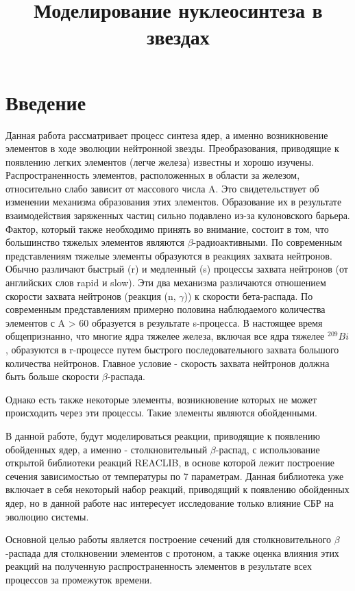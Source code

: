 \documentclass[%
master,    %
natbib,      %
subf,        %
href,        %
colorlinks,  %
]{disser}
\begin{document}
\title{Моделирование нуклеосинтеза в звездах}
\maketitle
\section*{\centering Введение}
Данная работа рассматривает процесс синтеза ядер, а именно возникновение элементов в ходе эволюции нейтронной звезды. Преобразования, приводящие к появлению легких элементов (легче железа) известны и хорошо изучены. Распространенность элементов, расположенных в области за железом, относительно слабо зависит от массового числа A. Это свидетельствует об изменении механизма образования этих элементов.  Образование их в результате взаимодействия заряженных частиц сильно подавлено из-за кулоновского барьера. Фактор, который также необходимо принять во внимание, состоит в том, что большинство тяжелых элементов являются $\beta$-радиоактивными. По современным представлениям тяжелые элементы образуются в реакциях захвата нейтронов. Обычно различают быстрый (r) и медленный (s) процессы захвата нейтронов (от английских слов rapid и slow). Эти два механизма различаются отношением скорости захвата нейтронов (реакция (n, $\gamma$)) к скорости бета-распада. По современным представлениям примерно половина наблюдаемого количества элементов с A > 60 образуется в результате s-процесса. В настоящее время общепризнанно, что многие ядра тяжелее железа, включая все ядра тяжелее $^{209}Bi$, образуются в r-процессе путем быстрого последовательного захвата большого количества нейтронов. Главное условие - скорость захвата нейтронов должна быть больше скорости $\beta$-распада. 

Однако есть также некоторые элементы, возникновение которых не может происходить через эти процессы. Такие элементы являются обойденными. 

В данной работе, будут моделироваться реакции, приводящие к появлению обойденных ядер, а именно - столкновительный $\beta$-распад, с использование открытой библиотеки реакций REACLIB, в основе которой лежит построение сечения зависимостью от температуры по 7 параметрам. Данная библиотека уже включает в себя некоторый набор реакций, приводящий к появлению обойденных ядер, но в данной работе нас интересует исследование только влияние СБР на эволюцию системы. 

Основной целью работы является построение сечений для столкновительного $\beta$-распада для столкновении элементов с протоном, а также оценка влияния этих реакций на полученную распространенность элементов в результате всех процессов за промежуток времени.
\end{document}
